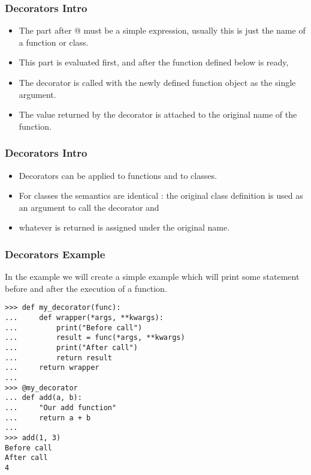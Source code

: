 \begin{frame}[fragile]\frametitle{Decorators Intro}
    \begin{itemize}
    \item The part after @ must be a simple expression, usually this is just the name of a function or class. 
    \item This part is evaluated first, and after the function defined below is ready,
    \item The decorator is called with the newly defined function object as the single argument. 
    \item The value returned by the decorator is attached to the original name of the function.
    \end{itemize}
\end{frame}

\begin{frame}[fragile]\frametitle{Decorators Intro}
    \begin{itemize}
    \item Decorators can be applied to functions and to classes. 
    \item For classes the semantics are identical : the original class definition is used as an argument to call the decorator and 
    \item whatever is returned is assigned under the original name.
    \end{itemize}
\end{frame}

\begin{frame}[fragile]\frametitle{Decorators Example}
In the example we will create a simple example which will print some statement before and after the execution of a function.
        \begin{lstlisting}
>>> def my_decorator(func):
...     def wrapper(*args, **kwargs):
...         print("Before call")
...         result = func(*args, **kwargs)
...         print("After call")
...         return result
...     return wrapper
...
>>> @my_decorator
... def add(a, b):
...     "Our add function"
...     return a + b
...
>>> add(1, 3)
Before call
After call
4
\end{lstlisting}
\end{frame}



